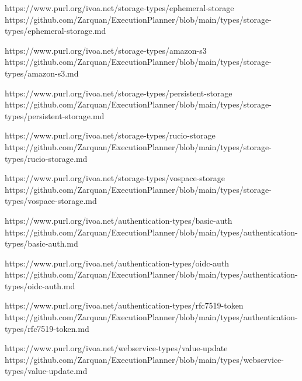 \documentclass[11pt,a4paper]{ivoa}
\begin{document}
https://www.purl.org/ivoa.net/storage-types/ephemeral-storage
https://github.com/Zarquan/ExecutionPlanner/blob/main/types/storage-types/ephemeral-storage.md

https://www.purl.org/ivoa.net/storage-types/amazon-s3
https://github.com/Zarquan/ExecutionPlanner/blob/main/types/storage-types/amazon-s3.md

https://www.purl.org/ivoa.net/storage-types/persistent-storage
https://github.com/Zarquan/ExecutionPlanner/blob/main/types/storage-types/persistent-storage.md

https://www.purl.org/ivoa.net/storage-types/rucio-storage
https://github.com/Zarquan/ExecutionPlanner/blob/main/types/storage-types/rucio-storage.md

https://www.purl.org/ivoa.net/storage-types/vospace-storage
https://github.com/Zarquan/ExecutionPlanner/blob/main/types/storage-types/vospace-storage.md

https://www.purl.org/ivoa.net/authentication-types/basic-auth
https://github.com/Zarquan/ExecutionPlanner/blob/main/types/authentication-types/basic-auth.md

https://www.purl.org/ivoa.net/authentication-types/oidc-auth
https://github.com/Zarquan/ExecutionPlanner/blob/main/types/authentication-types/oidc-auth.md

https://www.purl.org/ivoa.net/authentication-types/rfc7519-token
https://github.com/Zarquan/ExecutionPlanner/blob/main/types/authentication-types/rfc7519-token.md

https://www.purl.org/ivoa.net/webservice-types/value-update
https://github.com/Zarquan/ExecutionPlanner/blob/main/types/webservice-types/value-update.md




\end{document}
